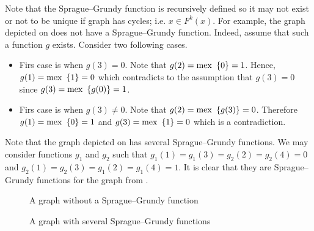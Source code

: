 Note that the Sprague--Grundy function is recursively defined so it may
not exist or not to be unique if graph has cycles; i.e. $x \in F^k(x)$.
For example, the graph depicted on 
does not have a Sprague--Grundy function.
Indeed, assume that such a function $g$ exists. Consider two following cases.
\begin{itemize}
    \item Firs case is when $g(3) = 0$. Note that $g(2) = \mex \set{0} = 1$.
        Hence, $g(1) = \mex \set{1} = 0$ which contradicts to the assumption
        that $g(3) = 0$ since $g(3) = \mex \set{g(0)} = 1$.
    \item Firs case is when $g(3) \neq 0$. Note that $g(2) = \mex \set{g(3)} = 0$.
        Therefore $g(1) = \mex \set{0} = 1$ and $g(3) = \mex \set{1} = 0$ which
        is a contradiction.
\end{itemize}

Note that the graph depicted on  has
several Sprague--Grundy functions. We may consider functions $g_1$ and $g_2$
such that $g_1(1) = g_1(3) = g_2(2) = g_2(4) = 0$ and
$g_2(1) = g_2(3) = g_1(2) = g_1(4) = 1$. It is clear that they are
Sprague--Grundy functions for the graph from .
\begin{figure}
    \begin{center}
    \end{center}

    \caption{A graph without a Sprague--Grundy function}
    \label{figure:sprague-grundy-not-exists}
\end{figure}

\begin{figure}
    \begin{center}
    \end{center}

    \caption{A graph with several Sprague--Grundy functions}
    \label{figure:sprague-grundy-not-unique}
\end{figure}


